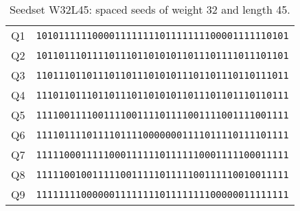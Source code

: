 \begin{table}[!ht]
	\centering
	\begin{tabular}{l r}
		Q1 & \verb|101011111100001111111101111111100001111110101| \\
		Q2 & \verb|101101110111101110110101011011101111011101101| \\
		Q3 & \verb|110111011011101101110101011101101110110111011| \\
		Q4 & \verb|111011011101101110110101011011101101110110111| \\
		Q5 & \verb|111100111100111100111101111001111001111001111| \\
		Q6 & \verb|111101111011110111100000001111011110111101111| \\
		Q7 & \verb|111110001111100011111101111110001111100011111| \\
		Q8 & \verb|111110010011111001111101111100111110010011111| \\
		Q9 & \verb|111111110000001111111101111111100000011111111| \\
		\bottomrule
	\end{tabular}
	\caption{Seedset W32L45: spaced seeds of weight 32 and length 45.}
	\label{tab:seedset-W32L45}
\end{table}
